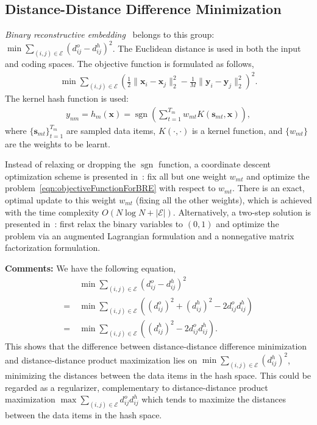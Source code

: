 \documentclass[10pt,journal,compsoc]{IEEEtran}
\begin{document}
\subsection{Distance-Distance Difference Minimization}
\emph{Binary reconstructive embedding}~\cite{KulisD09}
belongs to this group:
$\operatorname{min}\sum_{(i,j) \in \mathcal{E}}(d_{ij}^o - d_{ij}^h)^2$.
The Euclidean distance is used
in both the input and coding spaces.
The objective function is formulated as follows,
\begin{align}
\min\sum\nolimits_{(i,j) \in \mathcal{E}} (\frac{1}{2} \|\mathbf{x}_i - \mathbf{x}_j\|_2^2 - \frac{1}{M} \|\mathbf{y}_i - \mathbf{y}_j\|_2^2)^2.\label{eqn:objectiveFunctionForBRE}
\end{align}
The kernel hash function is used:
\begin{align}
y_{nm} = h_m(\mathbf{x})
= \operatorname{sgn}(\sum\nolimits_{t=1}^{T_m} w_{mt} K(\mathbf{s}_{mt}, \mathbf{x})),
\end{align}
where $\{\mathbf{s}_{mt}\}_{t=1}^{T_m}$ are sampled data items,
$K(\cdot,\cdot)$ is a kernel function,
and $\{w_{mt}\}$ are the weights
to be learnt.

Instead of relaxing or dropping the $\operatorname{sgn}$ function,
a coordinate descent optimization scheme is presented in~\cite{KulisD09}:
fix all but one weight $w_{mt}$
and optimize the problem~\ref{eqn:objectiveFunctionForBRE}
with respect to $w_{mt}$.
There is
an exact, optimal update to this weight $w_{mt}$
(fixing all the other weights),
which is achieved with the time complexity $O(N\log N + |\mathcal{E}|)$.
Alternatively, a two-step solution is presented in~\cite{MukherjeeRIHS15}:
first relax the binary variables to $(0,1)$ and
optimize the problem via an augmented Lagrangian formulation
and a nonnegative matrix factorization formulation.


\textbf{Comments:}
We have the following equation,
\begin{align}
&~\operatorname{min}\sum\nolimits_{(i,j) \in \mathcal{E}}(d_{ij}^o - d_{ij}^h)^2 \\
=&~ \operatorname{min}\sum\nolimits_{(i,j) \in \mathcal{E}}((d_{ij}^o)^2 + (d_{ij}^h)^2 - 2 d_{ij}^o d_{ij}^h) \\
=&~ \operatorname{min}\sum\nolimits_{(i,j) \in \mathcal{E}}((d_{ij}^h)^2 - 2 d_{ij}^o d_{ij}^h).
\end{align}
This shows that the difference between distance-distance difference minimization
and distance-distance product maximization
lies on $\operatorname{min} \sum_{(i,j) \in \mathcal{E}}(d_{ij}^h)^2$,
minimizing the distances between the data items in the hash space.
This could be regarded as a regularizer,
complementary to distance-distance product maximization $\operatorname{max}\sum_{(i,j) \in \mathcal{E}} d_{ij}^o d_{ij}^h$
which tends to maximize the distances between the data items in the hash space.
\end{document}
